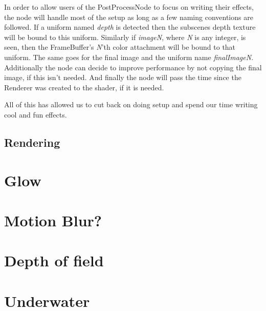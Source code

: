 In order to allow users of the PostProcessNode to focus on writing
their effects, the node will handle most of the setup as long as a few
naming conventions are followed. If a uniform named \textit{depth} is
detected then the subscenes depth texture will be bound to this
uniform. Similarly if \textit{imageN}, where \textit{N} is any
integer, is seen, then the FrameBuffer's \textit{N}'th color
attachment will be bound to that uniform. The same goes for the final
image and the uniform name \textit{finalImageN}. Additionally the node
can decide to improve performance by not copying the final image, if
this isn't needed. And finally the node will pass the time since the
Renderer was created to the shader, if it is needed.

All of this has allowed us to cut back on doing setup and spend our
time writing cool and fun effects.

\subsection*{Rendering}







\section{Glow}



\section{Motion Blur?}


\section{Depth of field}


\section{Underwater}



